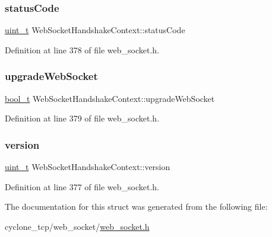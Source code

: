 \subsubsection{\texorpdfstring{status\+Code}{statusCode}}
{\footnotesize\ttfamily \hyperlink{compiler__port_8h_a12a1e9b3ce141648783a82445d02b58d}{uint\+\_\+t} Web\+Socket\+Handshake\+Context\+::status\+Code}



Definition at line 378 of file web\+\_\+socket.\+h.

\mbox{\label{structWebSocketHandshakeContext_afcbf1dd5bbba5e6d6dd08868eadd5626}} 
\subsubsection{\texorpdfstring{upgrade\+Web\+Socket}{upgradeWebSocket}}
{\footnotesize\ttfamily \hyperlink{compiler__port_8h_a812d16e5494522586b3784e55d479912}{bool\+\_\+t} Web\+Socket\+Handshake\+Context\+::upgrade\+Web\+Socket}



Definition at line 379 of file web\+\_\+socket.\+h.

\mbox{\label{structWebSocketHandshakeContext_a9496aee1b2e4fcf092e06f99d2e4762d}} 
\subsubsection{\texorpdfstring{version}{version}}
{\footnotesize\ttfamily \hyperlink{compiler__port_8h_a12a1e9b3ce141648783a82445d02b58d}{uint\+\_\+t} Web\+Socket\+Handshake\+Context\+::version}



Definition at line 377 of file web\+\_\+socket.\+h.



The documentation for this struct was generated from the following file\+:\begin{DoxyCompactItemize}
\item 
cyclone\+\_\+tcp/web\+\_\+socket/\hyperlink{web__socket_8h}{web\+\_\+socket.\+h}\end{DoxyCompactItemize}

